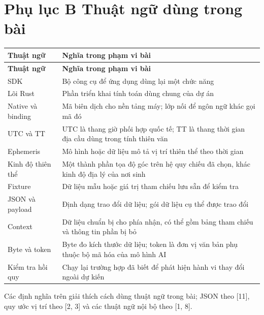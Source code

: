 \documentclass[11pt,a4paper]{article}
\begin{document}
\section*{Phụ lục B Thuật ngữ dùng trong bài}
{\fontsize{10}{12}\selectfont\begin{longtable}{>{\raggedright\arraybackslash}p{}>{\raggedright\arraybackslash}p{}}
\toprule \textbf{Thuật ngữ} & \textbf{Nghĩa trong phạm vi bài} \\ \midrule
\endfirsthead\toprule \textbf{Thuật ngữ} & \textbf{Nghĩa trong phạm vi bài} \\ \midrule\endhead\bottomrule\endfoot

SDK & Bộ công cụ để ứng dụng dùng lại một chức năng \\
Lõi Rust & Phần triển khai tính toán dùng chung của dự án \\
Native và binding & Mã biên dịch cho nền tảng máy; lớp nối để ngôn ngữ khác gọi mã đó \\
UTC và TT & UTC là thang giờ phối hợp quốc tế; TT là thang thời gian địa cầu dùng trong tính thiên văn \\
Ephemeris & Mô hình hoặc dữ liệu mô tả vị trí thiên thể theo thời gian \\
Kinh độ thiên thể & Một thành phần tọa độ góc trên hệ quy chiếu đã chọn, khác kinh độ địa lý của nơi sinh \\
Fixture & Dữ liệu mẫu hoặc giá trị tham chiếu lưu sẵn để kiểm tra \\
JSON và payload & Định dạng trao đổi dữ liệu; gói dữ liệu cụ thể được trao đổi \\
Context & Dữ liệu chuẩn bị cho phía nhận, có thể gồm bảng tham chiếu và thông tin phần bị bỏ \\
Byte và token & Byte đo kích thước dữ liệu; token là đơn vị văn bản phụ thuộc bộ mã hóa của mô hình AI \\
Kiểm tra hồi quy & Chạy lại trường hợp đã biết để phát hiện hành vi thay đổi ngoài dự kiến \\
\end{longtable}}
Các định nghĩa trên giải thích cách dùng thuật ngữ trong bài; JSON theo [11], quy ước vị trí theo [2, 3] và các thuật ngữ nội bộ theo [1, 8].
\end{document}
